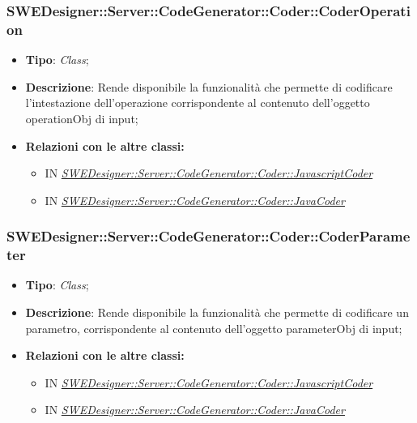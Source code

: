 \documentclass[../SpecificaTecnica.tex]{subfiles}
\begin{document}
			\subsubsection{SWEDesigner::Server::CodeGenerator::Coder::CoderOperation}
			\hypertarget{SWEDesigner::Server::CodeGenerator::Coder::CoderOperation}{}
			\begin{itemize}
				\item \textbf{Tipo}: \emph{Class};
				\item \textbf{Descrizione}: Rende disponibile la funzionalità che permette di codificare l'intestazione dell'operazione corrispondente al contenuto dell'oggetto operationObj di input;
				\item \textbf{Relazioni con le altre classi:}
				\begin{itemize}
					\item IN \hyperlink{SWEDesigner::Server::CodeGenerator::Coder::JavascriptCoder}{\emph{SWEDesigner::Server::CodeGenerator::Coder::JavascriptCoder}}
					\item IN \hyperlink{SWEDesigner::Server::CodeGenerator::Coder::JavaCoder}{\emph{SWEDesigner::Server::CodeGenerator::Coder::JavaCoder}}
				\end{itemize}	
			\end{itemize}
			
			
			
			\subsubsection{SWEDesigner::Server::CodeGenerator::Coder::CoderParameter}
			\hypertarget{SWEDesigner::Server::CodeGenerator::Coder::CoderParameter}{}
			\begin{itemize}
				\item \textbf{Tipo}: \emph{Class};
				\item \textbf{Descrizione}: Rende disponibile la funzionalità che permette di codificare un parametro, corrispondente al contenuto dell'oggetto parameterObj di input;
				\item \textbf{Relazioni con le altre classi:}
				\begin{itemize}
					\item IN \hyperlink{SWEDesigner::Server::CodeGenerator::Coder::JavascriptCoder}{\emph{SWEDesigner::Server::CodeGenerator::Coder::JavascriptCoder}}
					\item IN \hyperlink{SWEDesigner::Server::CodeGenerator::Coder::JavaCoder}{\emph{SWEDesigner::Server::CodeGenerator::Coder::JavaCoder}}
				\end{itemize}	
			\end{itemize}
			
\end{document}
